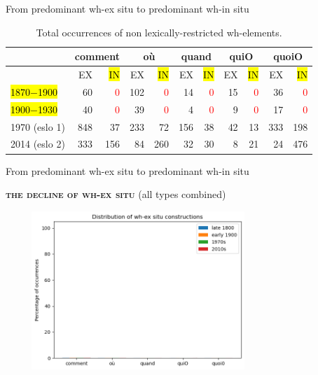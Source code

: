 \documentclass[lesson_slides]{subfiles}
\begin{document}
\begin{frame}[c]{From predominant wh-ex situ to predominant wh-in situ}

\begin{table}[H]
    \centering
    \small
    \begin{adjustbox}
        \begin{tabular}{l|rr|rr|rr|rr|rr}
        {} & \multicolumn{2}{c}{comment}  & \multicolumn{2}{c}{où} & \multicolumn{2}{c}{quand} & \multicolumn{2}{c}{quiO}& \multicolumn{2}{c}{quoiO}\\
        \hline
        {} & EX & \hl{IN} & EX & \hl{IN} & EX & \hl{IN} & EX & \hl{IN} & EX & \hl{IN}\\
        \hl{1870$-$1900} & 60 & \textcolor{red}{0} & 102 & \textcolor{red}{0} & 14 & \textcolor{red}{0} & 15 & \textcolor{red}{0} & 36 & \textcolor{red}{0}\\
        \hl{1900$-$1930} & 40 & \textcolor{red}{0} & 39 & \textcolor{red}{0} & 4 & \textcolor{red}{0} & 9 & \textcolor{red}{0} & 17 & \textcolor{red}{0}\\
        1970 (eslo 1) & 848 & 37 & 233 & 72 & 156 & 38 & 42 & 13 & 333 & 198\\
        2014 (eslo 2) & 333 & 156 & 84 & 260 & 32 & 30 & 8 & 21 & 24 & 476 \\
        \hline
        \end{tabular}
    \end{adjustbox}
\caption{\label{tab:samp3}Total occurrences of non lexically-restricted wh-elements.}
\end{table}
  
\end{frame}
\begin{frame}[c]{From predominant wh-ex situ to predominant wh-in situ}

    \textbf{\textsc{the decline of wh-ex situ}} \pause (all types combined) \pause
    \begin{center}
        \includegraphics[width=10cm, height=6cm]{images/exsitu.png}
    \end{center}
  
\end{frame}
\end{document}
